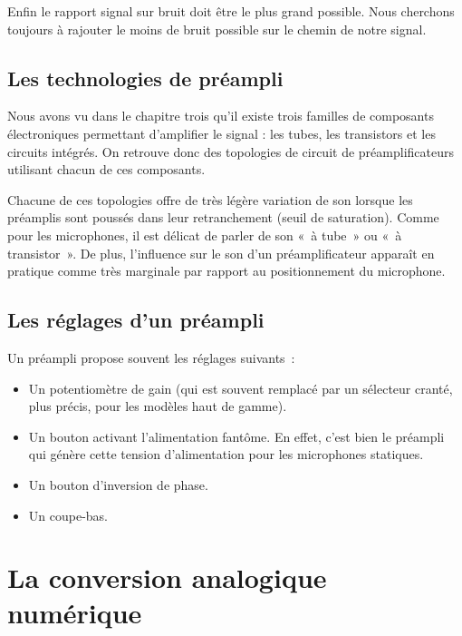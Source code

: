 \documentclass[
]{book}
\providecommand{\tightlist}{%
  \setlength{\itemsep}{0pt}\setlength{\parskip}{0pt}}
\begin{document}
Enfin le rapport signal sur bruit doit être le plus grand possible. Nous cherchons toujours à rajouter le moins de bruit possible sur le chemin de notre signal.

\hypertarget{les-technologies-de-pruxe9ampli}{%
\section{Les technologies de préampli}\label{les-technologies-de-pruxe9ampli}}

Nous avons vu dans le chapitre trois qu'il existe trois familles de composants électroniques permettant d'amplifier le signal : les tubes, les transistors et les circuits intégrés. On retrouve donc des topologies de circuit de préamplificateurs utilisant chacun de ces composants.

Chacune de ces topologies offre de très légère variation de son lorsque les préamplis sont poussés dans leur retranchement (seuil de saturation). Comme pour les microphones, il est délicat de parler de son «~à tube~» ou «~à transistor~». De plus, l'influence sur le son d'un préamplificateur apparaît en pratique comme très marginale par rapport au positionnement du microphone.

\hypertarget{les-ruxe9glages-dun-pruxe9ampli}{%
\section{Les réglages d'un préampli}\label{les-ruxe9glages-dun-pruxe9ampli}}

Un préampli propose souvent les réglages suivants~:

\begin{itemize}
\tightlist
\item
  Un potentiomètre de gain (qui est souvent remplacé par un sélecteur cranté, plus précis, pour les modèles haut de gamme).
\item
  Un bouton activant l'alimentation fantôme. En effet, c'est bien le préampli qui génère cette tension d'alimentation pour les microphones statiques.
\item
  Un bouton d'inversion de phase.
\item
  Un coupe-bas.
\end{itemize}

\hypertarget{la-conversion-analogique-numuxe9rique}{%
\chapter{La conversion analogique numérique}\label{la-conversion-analogique-numuxe9rique}}
\end{document}
